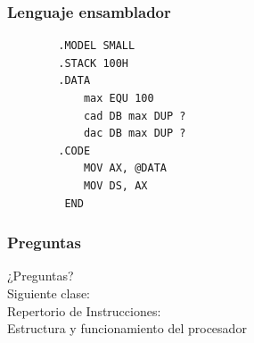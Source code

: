 \documentclass{beamer}
\begin{document}
\begin{frame}[fragile]
	\frametitle{Lenguaje ensamblador}
	\begin{center}	
	\begin{lstlisting}
		.MODEL SMALL
		.STACK 100H
		.DATA
		    max EQU 100
		    cad DB max DUP ?
		    dac DB max DUP ?
		.CODE
		    MOV AX, @DATA
		    MOV DS, AX
		 END
	\end{lstlisting}
	\end{center}				
\end{frame}



\begin{frame}
	\frametitle{Preguntas}
	\vfill
	\begin{center}
	¿Preguntas?\\
	\vfill
	Siguiente clase: \\
	Repertorio de Instrucciones: \\
	Estructura y funcionamiento del procesador
	\end{center}
\end{frame}
\end{document}
